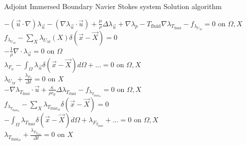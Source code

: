 \documentclass[10pt]{article} %
\begin{document}
\begin{center}
\begin{flushleft}
	Adjoint Immersed Boundary Navier Stokes system Solution algorithm
\end{flushleft}


	$-(\vec{u}\cdot\nabla) \lambda_{\vec{u}} - \left(\nabla \lambda_{\vec{u}} \cdot \vec{u}\right) + \frac{\mu}{\rho} \Delta \lambda_{\vec{u}} + \nabla\lambda_p - T_{\text{fluid}} \nabla \lambda_{T_{\text{fluid}}} - f_{\lambda_{U_M}} = 0$ \quad on $\Omega,X$\\
	$f_{\lambda_{U_M}} - \sum_X \lambda_{U_M}(X) \delta(\vec{x}-\vec{X}) = 0$\\
	$-\frac{1}{\rho} \nabla \cdot \lambda_{\vec{u}} = 0$ \quad on $\Omega$\\
	$\lambda_{F_u} - \int_{\Omega} \lambda_{\vec{u}} \delta (\vec{x}-\vec{X}) d\Omega + ... = 0$ \quad on $\Omega,X$\\
	$\lambda_{U_M} + \frac{\lambda_{F_u}}{\Delta t}=0$ \quad on $X$\\
	$-\nabla \lambda_{T_{\text{fluid}}} \cdot \vec{u} + \frac{\kappa}{\rho c_p} \Delta  \lambda_{T_{\text{fluid}}} - f_{\lambda_{T_{\text{fluid}_M}}} = 0$ \quad on $\Omega,X$\\
	$f_{\lambda_{T_{\text{fluid}_M}}} - \sum_{X} \lambda_{T_{\text{fluid}_M}} \delta (\vec{x}-\vec{X}) = 0$\\
	$-\int_{\Omega} \lambda_{T_{\text{fluid}}} \delta (\vec{x}-\vec{X}) d\Omega + \lambda_{F_{T_{\text{fluid}}}} + ... = 0$ \quad on $\Omega, X$\\
	$\lambda_{T_{\text{fluid}_M}} + \frac{\lambda_{F_{T_{\text{fluid}}}}}{\Delta t} =0$ \quad on $X$
	

\end{center}
\end{document}
